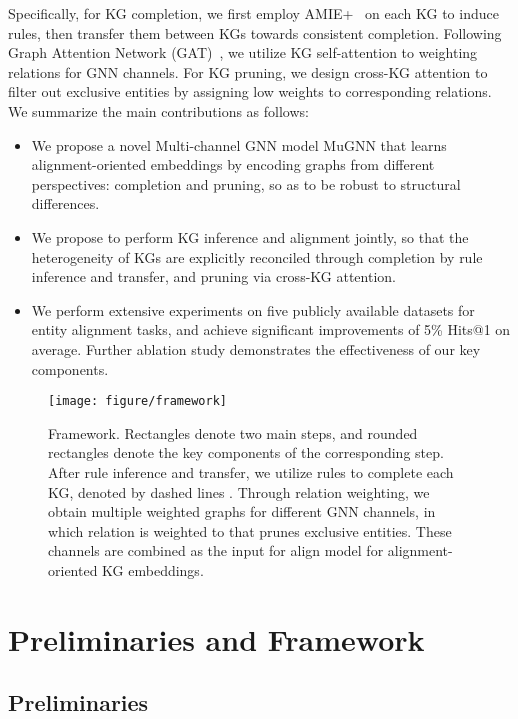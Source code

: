 \documentclass[11pt,a4paper]{article}
\begin{document}
Specifically, for KG completion, we first employ AMIE+~\cite{galarraga2015fast} on each KG to induce rules, then transfer them between KGs towards consistent completion. Following Graph Attention Network (GAT)~\cite{velivckovic2018graph}, we utilize KG self-attention to weighting relations for GNN channels. For KG pruning, we design cross-KG attention to filter out exclusive entities by assigning low weights to corresponding relations. We summarize the main contributions as follows:

\begin{itemize}
	\item We propose a novel Multi-channel GNN model MuGNN that learns alignment-oriented embeddings by encoding graphs from different perspectives: completion and pruning, so as to be robust to structural differences.

	\item We propose to perform KG inference and alignment jointly, so that the heterogeneity of KGs are explicitly reconciled through completion by rule inference and transfer, and pruning via cross-KG attention.

	\item We perform extensive experiments on five publicly available datasets for entity alignment tasks, and achieve significant improvements of 5\% Hits@1 on average. Further ablation study demonstrates the effectiveness of our key components.
\end{itemize}

\begin{figure*}[htb]
	\centerline{\texttt{[image: figure/framework]}}
	\caption{Framework. Rectangles denote two main steps, and rounded rectangles denote the key components of the corresponding step. After rule inference and transfer, we utilize rules to complete each KG, denoted by dashed lines . Through relation weighting, we obtain multiple weighted graphs for different GNN channels, in which relation  is weighted to  that prunes exclusive entities. These channels are combined as the input for align model for alignment-oriented KG embeddings.}
	\label{fig:framework}
\end{figure*}

\section{Preliminaries and Framework}
\subsection{Preliminaries}
\end{document}
